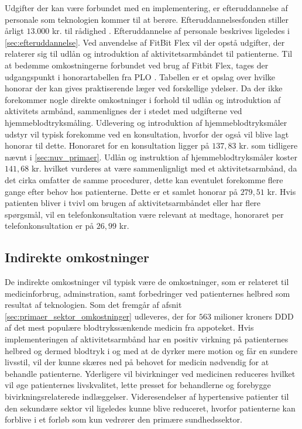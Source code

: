 Udgifter der kan være forbundet med en implementering, er efteruddannelse af personale som teknologien kommer til at berøre. Efteruddannelsesfonden stiller årligt $13.000$ kr. til rådighed \citep{vedsted2005}. Efteruddannelse af personale beskrives ligeledes i \autoref{sec:efteruddannelse}.   
Ved anvendelse af FitBit Flex vil der opstå udgifter, der relaterer sig til udlån og introduktion af aktivitetsarmbåndet til patienterne. Til at bedømme omkostningerne forbundet ved brug af Fitbit Flex, tages der udgangspunkt i honorartabellen fra PLO \citep{honorartabel2016}. Tabellen er et opslag over hvilke honorar der kan gives praktiserende læger ved forskellige ydelser.
Da der ikke forekommer nogle direkte omkostninger i forhold til udlån og introduktion af aktivitets armbånd, sammenlignes der i stedet med udgifterne ved hjemmeblodtryksmåling. Udlevering og introduktion af hjemmeblodtryksmåler udstyr vil typisk forekomme ved en konsultation, hvorfor der også vil blive lagt honorar til dette. Honoraret for en konsultation ligger på $137,83$ kr. som tidligere nævnt i \autoref{sec:nuv_primaer}. Udlån og instruktion af hjemmeblodtryksmåler koster $141,68$ kr. hvilket vurderes at være sammenlignligt med et aktivitetsarmbånd, da det cirka omfatter de samme procedurer, dette kan eventulet forekomme flere gange efter behov hos patienterne. Dette er et samlet honorar på $279,51$ kr. Hvis patienten bliver i tvivl om brugen af aktivitetsarmbåndet eller har flere spørgsmål, vil en telefonkonsultation være relevant at medtage, honoraret per telefonkonsultation er på $26,99$ kr.

\subsection{Indirekte omkostninger} \label{sec:indir_omkost}
De indirekte omkostninger vil typisk være de omkostninger, som er relateret til medicinforbrug, adminstration, samt forbedringer ved patienternes helbred som resultat af teknologien. 
Som det fremgår af afsnit \autoref{sec:primaer_sektor_omkostninger} udleveres, der for $563$ milioner kroners DDD af det mest populære blodtrykssænkende medicin fra appoteket. Hvis implementeringen af aktivitetsarmbånd har en positiv virkning på patienternes helbred og dermed blodtryk i og med at de dyrker mere motion og får en sundere livsstil, vil der kunne skæres ned på behovet for medicin nødvendig for at behandle patienterne. Yderligere vil bivirkninger ved medicinen reduceres hvilket vil øge patienternes livskvalitet, lette presset for behandlerne og forebygge bivirkningsrelaterede indlæggelser. 
Videresendelser af hypertensive patienter til den sekundære sektor vil ligeledes kunne blive reduceret, hvorfor patienterne kan forblive i et forløb som kun vedrører den primære sundhedssektor.   %

